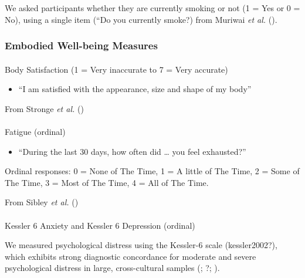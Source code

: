 \documentclass[
  single column]{article}
\makeatletter
\let\oldparagraph\paragraph
\renewcommand{\paragraph}{
    \@ifstar
      \xxxParagraphStar
      \xxxParagraphNoStar
  }
\newcommand{\xxxParagraphStar}[1]{\oldparagraph*{#1}\mbox{}}
\newcommand{\xxxParagraphNoStar}[1]{\oldparagraph{#1}\mbox{}}
\providecommand{\tightlist}{%
  \setlength{\itemsep}{0pt}\setlength{\parskip}{0pt}}\usepackage{longtable,booktabs,array}
\makeatother
\begin{document}
We asked participants whether they are currently smoking or not (1 = Yes
or 0 = No), using a single item (``Do you currently smoke?) from Muriwai
\emph{et al.} ().

\subsubsection{Embodied Well-being
Measures}\label{embodied-well-being-measures}

\paragraph{Body Satisfaction (1 = Very inaccurate to 7 = Very
accurate)}\label{body-satisfaction-1-very-inaccurate-to-7-very-accurate}

\begin{itemize}
\tightlist
\item
  ``I am satisfied with the appearance, size and shape of my body''
\end{itemize}

From Stronge \emph{et al.} ()

\paragraph{Fatigue (ordinal)}\label{fatigue-ordinal}

\begin{itemize}
\tightlist
\item
  ``During the last 30 days, how often did \ldots{} you feel
  exhausted?''
\end{itemize}

Ordinal responses: 0 = None of The Time, 1 = A little of The Time, 2 =
Some of The Time, 3 = Most of The Time, 4 = All of The Time.

From Sibley \emph{et al.} ()

\paragraph{Kessler 6 Anxiety and Kessler 6 Depression
(ordinal)}\label{kessler-6-anxiety-and-kessler-6-depression-ordinal}

We measured psychological distress using the Kessler-6 scale
(kessler2002?), which exhibits strong diagnostic concordance for
moderate and severe psychological distress in large, cross-cultural
samples (;
?;
).
\end{document}
